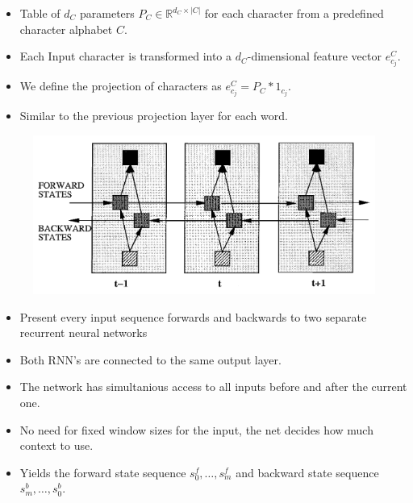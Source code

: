 \documentclass[11pt, a4paper, landscape]{article}
\begin{document}
\NewPage{}

\vfill
\begin{itemize}
  \item Table of $d_C$ parameters $P_C \in \mathbb{R}^{d_C \times |C|}$ for each character from a predefined character alphabet $C$.
  \item Each Input character is transformed into a $d_C$-dimensional feature vector $e_{c_j}^C$.
  \item We define the projection of characters as $e_{c_j}^C = P_C * 1_{c_j}$.
  \item Similar to the previous projection layer for each word.
\end{itemize}
\vfill

\NewPage{}

\vfill
\begin{figure}[H]
\begin{center}
  \includegraphics[width=.5\linewidth]{../article/img/brnn-unfolded}
\end{center}
\end{figure}
\begin{itemize}
\item Present every input sequence forwards and backwards to two separate recurrent neural networks 
\item Both RNN's are connected to the same output layer.
\item The network has simultanious access to all inputs before and after the current one.
\item No need for fixed window sizes for the input, the net decides how much context to use.
\item Yields the forward state sequence $s_{0}^f, \dots, s_{m}^f$ and backward state sequence $s_{m}^b, \dots, s_{0}^b$.
\end{itemize}
\vfill


\NewPage{}
\end{document}
